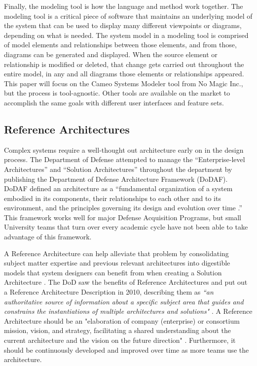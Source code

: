 \documentclass[conference]{joss-pretty}
\begin{document}
Finally, the modeling tool is how the language and method work together. The modeling tool is a critical piece of software that maintains an underlying model of the system that can be used to display many different viewpoints or diagrams, depending on what is needed. The system model in a modeling tool is comprised of model elements and relationships between those elements, and from those, diagrams can be generated and displayed. When the source element or relationship is modified or deleted, that change gets carried out throughout the entire model, in any and all diagrams those elements or relationships appeared. This paper will focus on the Cameo Systems Modeler tool from No Magic Inc., but the process is tool-agnostic. Other tools are available on the market to accomplish the same goals with different user interfaces and feature sets.


\subsection{Reference Architectures}
Complex systems require a well-thought out architecture early on in the design process. The Department of Defense attempted to manage the “Enterprise-level Architectures” and “Solution Architectures” throughout the department by publishing the Department of Defense Architecture Framework (DoDAF). DoDAF defined an architecture as a “fundamental organization of a system embodied in its components, their relationships to each other and to its environment, and the principles governing its design and evolution over time \citep{DoDAF}.” This framework works well for major Defense Acquisition Programs, but small University teams that turn over every academic cycle have not been able to take advantage of this framework. 

A Reference Architecture can help alleviate that problem by consolidating subject matter expertise and previous relevant architectures into digestible models that system designers can benefit from when creating a Solution Architecture \citep{Cloutier2010}. The DoD saw the benefits of Reference Architectures and put out a Reference Architecture Description in 2010, describing them as \textit{“an authoritative source of information about a  specific subject area that guides and constrains the instantiations of multiple  architectures and solutions"} \citep{RADescription}. A Reference Architecture should be an "elaboration of company (enterprise) or consortium mission, vision, and strategy, facilitating a shared understanding about the current architecture and the vision on the future direction" \citep{Cloutier2010}. Furthermore, it should be continuously developed and improved over time as more teams use the architecture.
\end{document}
